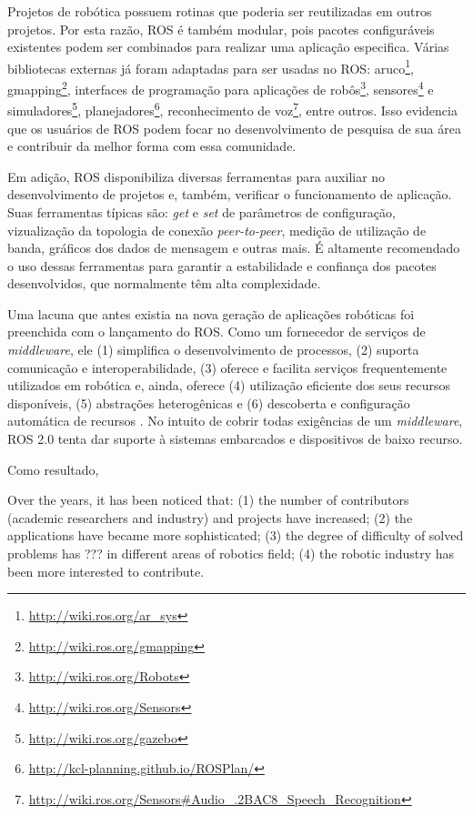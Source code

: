         Projetos de robótica possuem rotinas que poderia ser reutilizadas em outros projetos. Por esta razão, ROS é também modular, pois pacotes configuráveis existentes podem ser combinados para realizar uma aplicação especifica. Várias bibliotecas externas já foram adaptadas para ser usadas no ROS: aruco\footnote{\url{http://wiki.ros.org/ar_sys}}, gmapping\footnote{\url{http://wiki.ros.org/gmapping}}, interfaces de programação para aplicações de robôs\footnote{\url{http://wiki.ros.org/Robots}}, sensores\footnote{\url{http://wiki.ros.org/Sensors}} e simuladores\footnote{\url{http://wiki.ros.org/gazebo}}, planejadores\footnote{\url{http://kcl-planning.github.io/ROSPlan/}}, reconhecimento de voz\footnote{\url{http://wiki.ros.org/Sensors\#Audio_.2BAC8_Speech_Recognition}}, entre outros. Isso evidencia que os usuários de ROS podem focar no desenvolvimento de pesquisa de sua área e contribuir da melhor forma com essa comunidade.
        
        Em adição, ROS disponibiliza diversas ferramentas para auxiliar no desenvolvimento de projetos e, também, verificar o funcionamento de aplicação. Suas ferramentas típicas são: \textit{get} e \textit{set} de parâmetros de configuração, vizualização da topologia de conexão \textit{peer-to-peer}, medição de utilização de banda, gráficos dos dados de mensagem e outras mais. É altamente recomendado o uso dessas ferramentas para garantir a estabilidade e confiança dos pacotes desenvolvidos, que normalmente têm alta complexidade.
        
        Uma lacuna que antes existia na nova geração de aplicações robóticas foi preenchida com o lançamento do ROS. Como um fornecedor de serviços de \textit{middleware}, ele (1) simplifica o desenvolvimento de processos, (2) suporta comunicação e interoperabilidade, (3) oferece e facilita serviços frequentemente utilizados em robótica e, ainda, oferece (4) utilização eficiente dos seus recursos disponíveis, (5) abstrações heterogênicas e (6) descoberta e configuração automática de recursos \cite{ref:quigley2009ros}. No intuito de cobrir todas exigências de um \textit{middleware}, ROS 2.0 tenta dar suporte à sistemas embarcados e dispositivos de baixo recurso.
        
        Como resultado, 
        
        Over the years, it has been noticed that:
    	(1) the number of contributors (academic researchers and industry) and projects have increased;
    	(2) the applications have became more sophisticated;
    	(3) the degree of difficulty of solved problems has ??? in different areas of robotics field;
    	(4) the robotic industry has been more interested to contribute.
    	
